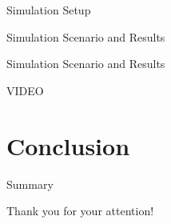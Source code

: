 \documentclass[10pt]{beamer}
\begin{document}
\begin{frame}{Simulation Setup}

\end{frame}

\begin{frame}{Simulation Scenario and Results}
	
\end{frame}

\begin{frame}{Simulation Scenario and Results}
	
	VIDEO
	
\end{frame}

\section{Conclusion}

\begin{frame}{Summary}

\end{frame}

{
\begin{frame}[standout]
Thank you for your attention!
\end{frame}
}

\appendix
\end{document}
